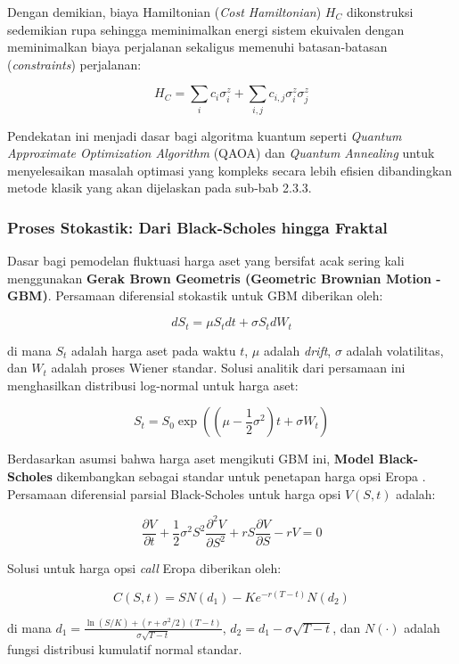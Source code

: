 Dengan demikian, biaya Hamiltonian (\textit{Cost Hamiltonian}) $H_C$ dikonstruksi sedemikian rupa sehingga meminimalkan energi sistem ekuivalen dengan meminimalkan biaya perjalanan sekaligus memenuhi batasan-batasan (\textit{constraints}) perjalanan:

\[ H_C = \sum_{i} c_i \sigma_i^z + \sum_{i,j} c_{i,j} \sigma_i^z \sigma_j^z \]

Pendekatan ini menjadi dasar bagi algoritma kuantum seperti \textit{Quantum Approximate Optimization Algorithm} (QAOA) dan \textit{Quantum Annealing} untuk menyelesaikan masalah optimasi yang kompleks secara lebih efisien dibandingkan metode klasik yang akan dijelaskan pada sub-bab 2.3.3.

\subsubsection{Proses Stokastik: Dari Black-Scholes hingga Fraktal}

Dasar bagi pemodelan fluktuasi harga aset yang bersifat acak sering kali menggunakan \textbf{Gerak Brown Geometris (Geometric Brownian Motion - GBM)}. Persamaan diferensial stokastik untuk GBM diberikan oleh:

\[ dS_t = \mu S_t dt + \sigma S_t dW_t \]

di mana $S_t$ adalah harga aset pada waktu $t$, $\mu$ adalah \textit{drift}, $\sigma$ adalah volatilitas, dan $W_t$ adalah proses Wiener standar. Solusi analitik dari persamaan ini menghasilkan distribusi log-normal untuk harga aset:

\[ S_t = S_0 \exp\left( (\mu - \frac{1}{2}\sigma^2)t + \sigma W_t \right) \]

Berdasarkan asumsi bahwa harga aset mengikuti GBM ini, \textbf{Model Black-Scholes} dikembangkan sebagai standar untuk penetapan harga opsi Eropa \citep{schwert_chapter_2003}. Persamaan diferensial parsial Black-Scholes untuk harga opsi $V(S, t)$ adalah:

\[ \frac{\partial V}{\partial t} + \frac{1}{2}\sigma^2 S^2 \frac{\partial^2 V}{\partial S^2} + rS \frac{\partial V}{\partial S} - rV = 0 \]

Solusi untuk harga opsi \textit{call} Eropa diberikan oleh:

\[ C(S, t) = S N(d_1) - K e^{-r(T-t)} N(d_2) \]

di mana $d_1 = \frac{\ln(S/K) + (r + \sigma^2/2)(T-t)}{\sigma\sqrt{T-t}}$, $d_2 = d_1 - \sigma\sqrt{T-t}$, dan $N(\cdot)$ adalah fungsi distribusi kumulatif normal standar.

